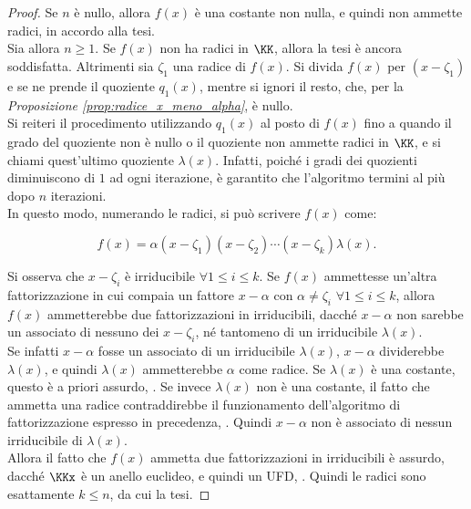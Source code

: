 \begin{proof} Se $n$ è nullo, allora $f(x)$ è una costante
    non nulla, e quindi non ammette radici, in accordo alla tesi. \\

    Sia allora $n \geq 1$. Se $f(x)$ non ha radici in $\KK$, allora
    la tesi è ancora soddisfatta. Altrimenti sia $\zeta_1$ una radice  di $f(x)$. Si divida $f(x)$ per
    $(x-\zeta_1)$ e se ne prende il quoziente $q_1(x)$, mentre si
    ignori il resto, che,
    per la \textit{Proposizione \ref{prop:radice_x_meno_alpha}},
    è nullo. \\

    Si reiteri il procedimento utilizzando $q_1(x)$ al
    posto di $f(x)$ fino a quando il grado del quoziente non è nullo o
    il quoziente non ammette radici in $\KK$, e si chiami quest'ultimo
    quoziente $\lambda(x)$.
    Infatti, poiché i gradi dei quozienti diminuiscono di $1$ ad
    ogni iterazione, è garantito che l'algoritmo termini al più
    dopo $n$ iterazioni. \\

    In questo modo, numerando le radici, si può scrivere $f(x)$ come:

    \begin{equation}
        \label{eq:fattorizzazione_fx}
        f(x)=\alpha(x-\zeta_1)(x-\zeta_2)\cdots(x-\zeta_k)\lambda(x).
    \end{equation}

    \vskip 0.1in

    Si osserva che $x-\zeta_i$ è irriducibile $\forall 1 \leq i \leq k$.
    Se $f(x)$ ammettesse un'altra fattorizzazione in cui compaia
    un fattore $x-\alpha$ con $\alpha \neq \zeta_i$ $\forall 1 \leq i \leq k$, allora $f(x)$ ammetterebbe due fattorizzazioni in
    irriducibili, dacché $x-\alpha$ non sarebbe un associato
    di nessuno dei $x-\zeta_i$, né tantomeno di un
    irriducibile $\lambda(x)$. \\

    Se infatti $x-\alpha$ fosse un associato di un
    irriducibile $\lambda(x)$, $x-\alpha$ dividerebbe
    $\lambda(x)$, e quindi $\lambda(x)$ ammetterebbe $\alpha$ come radice. Se $\lambda(x)$
    è una costante, questo è a priori assurdo, \Lightning{}. Se invece
    $\lambda(x)$ non è una costante, il fatto che ammetta una radice contraddirebbe il funzionamento
    dell'algoritmo di fattorizzazione espresso in precedenza, \Lightning{}. Quindi $x-\alpha$ non è associato di nessun irriducibile di $\lambda(x)$. \\

    Allora il fatto che $f(x)$ ammetta due fattorizzazioni in
    irriducibili è assurdo, dacché $\KKx$ è un anello euclideo, e
    quindi un UFD, \Lightning{}. Quindi le radici sono esattamente $k \leq n$, da cui la tesi.
\end{proof}

